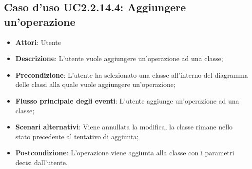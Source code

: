 \documentclass[../AnalisiDeiRequisiti.tex]{subfiles}
\begin{document}
			\subsection{Caso d'uso UC2.2.14.4: Aggiungere un'operazione}
			\begin{itemize}
				\item \textbf{Attori}: Utente
				\item \textbf{Descrizione}: L'utente vuole aggiungere un'operazione ad una classe;
				\item \textbf{Precondizione}: L'utente ha selezionato una classe all'interno del diagramma delle classi alla quale vuole aggiungere un'operazione;
				\item \textbf{Flusso principale degli eventi}: L'utente aggiunge un'operazione ad una classe;
				\item \textbf{Scenari alternativi}: Viene annullata la modifica, la classe rimane nello stato precedente al tentativo di aggiunta;
				\item \textbf{Postcondizione}: L'operazione viene aggiunta alla classe con i parametri decisi dall'utente.
			\end{itemize}
\end{document}
